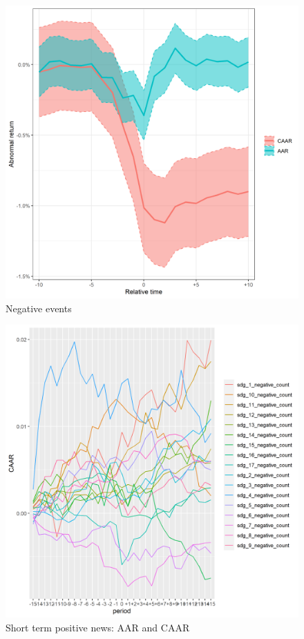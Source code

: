 \begin{figure}[!tbp]
\begin{minipage}[b]{0.45\textwidth}
    \includegraphics[scale=0.45]{Projekt/1.Figures analysis/ST_negative_all_CI.png}
    \caption{Negative events}
  \end{minipage}
\end{figure}


\begin{figure}
    \centering
    \includegraphics[scale=0.6]{Projekt/1.Figures analysis/ST_negative_sdgs.png}
    \caption{Short term positive news: AAR and CAAR}
    \label{fig:ST_pos_news}
\end{figure}